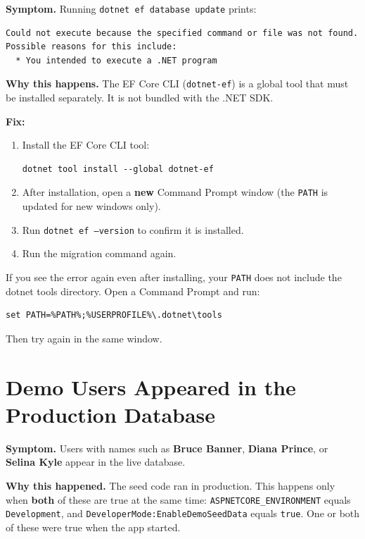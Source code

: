 \documentclass[a4paper,11pt]{article}
\begin{document}
\textbf{Symptom.}
Running \texttt{dotnet ef database update} prints:

\begin{lstlisting}
Could not execute because the specified command or file was not found.
Possible reasons for this include:
  * You intended to execute a .NET program
\end{lstlisting}

\textbf{Why this happens.}
The EF Core CLI (\texttt{dotnet-ef}) is a global tool that must be installed separately.
It is not bundled with the .NET SDK.

\textbf{Fix:}

\begin{enumerate}
  \item Install the EF Core CLI tool:
\begin{lstlisting}
dotnet tool install --global dotnet-ef
\end{lstlisting}
  \item After installation, open a \textbf{new} Command Prompt window
        (the \texttt{PATH} is updated for new windows only).
  \item Run \texttt{dotnet ef --version} to confirm it is installed.
  \item Run the migration command again.
\end{enumerate}

If you see the error again even after installing, your \texttt{PATH}
does not include the dotnet tools directory.
Open a Command Prompt and run:

\begin{lstlisting}
set PATH=%PATH%;%USERPROFILE%\.dotnet\tools
\end{lstlisting}

Then try again in the same window.

\section{Demo Users Appeared in the Production Database}
\label{sec:demodata}

\textbf{Symptom.}
Users with names such as \textbf{Bruce Banner}, \textbf{Diana Prince},
or \textbf{Selina Kyle} appear in the live database.

\textbf{Why this happened.}
The seed code ran in production.
This happens only when \textbf{both} of these are true at the same time:
\texttt{ASPNETCORE\_ENVIRONMENT} equals \texttt{Development},
and \texttt{DeveloperMode:EnableDemoSeedData} equals \texttt{true}.
One or both of these were true when the app started.
\end{document}
